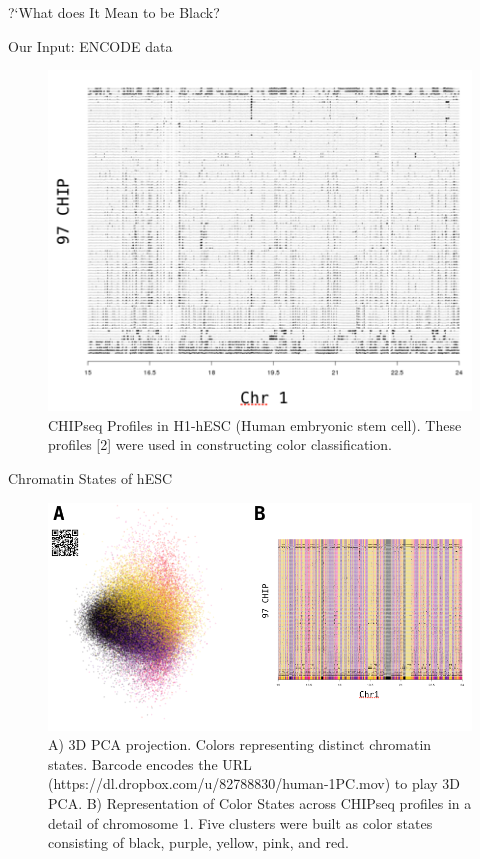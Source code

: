 \documentclass[serif,mathserif,final]{beamer}
\begin{document}
\begin{frame}{}
\begin{columns}[t]
\begin{column}{0.32\linewidth}
\begin{block}{?`What does It Mean to be Black?}
      \end{block}
      
      \begin{block}{Our Input: ENCODE data}
      	\begin{figure}[htb]
              \centering
              \includegraphics[width=0.5\columnwidth]{mat}
              \caption{CHIPseq Profiles in H1-hESC (Human embryonic stem cell). These profiles [2] were used in constructing color classification.}
      	\end{figure}       
      \end{block}

     
      \begin{block}{Chromatin States of hESC}
  		\begin{figure}
   			\includegraphics[width=.9\textwidth]{clusteredAnimatedPC}
			\caption{A) 3D PCA projection. Colors representing distinct chromatin states. Barcode encodes the URL (https://dl.dropbox.com/u/82788830/human-1PC.mov) to play 3D PCA. B) Representation of Color States across CHIPseq profiles in a detail of chromosome 1. Five clusters were built as color states consisting of black, purple, yellow, pink, and red.}
  		\end{figure}
	  \end{block}
    \end{column}
  

\end{columns}
\end{frame}
\end{document}
